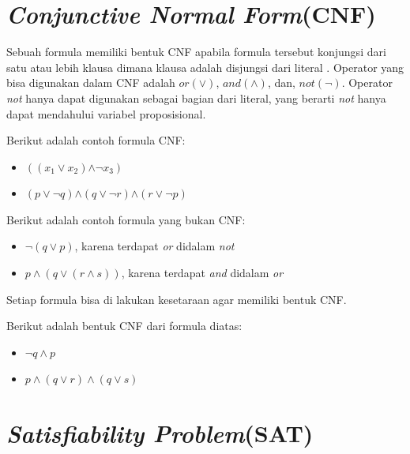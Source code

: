 	

\section{\textit{Conjunctive Normal Form}(CNF)}

Sebuah formula memiliki bentuk CNF apabila formula tersebut konjungsi dari satu atau lebih klausa dimana klausa adalah disjungsi dari literal \cite{huth2004logic}. Operator yang bisa digunakan dalam CNF adalah $\textit{or}\left(\vee\right)$, $\textit{and}\left(\wedge\right)$, dan, $\textit{not}\left(\neg\right)$. Operator \textit{not} hanya dapat digunakan sebagai bagian dari literal, yang berarti \textit{not} hanya dapat mendahului variabel proposisional.

Berikut adalah contoh formula CNF:
\begin{itemize}
	\item $\left(\left(\ensuremath{x_{1}}\ensuremath{\vee}\ensuremath{x_{2}}\right)\ensuremath{\wedge\neg}\ensuremath{x_{3}}\right)$
	\item $\left(p\vee\neg q\right)$$\wedge$$\left(q\vee\neg r\right)$$\wedge$$\left(r\vee\neg p\right)$
\end{itemize}

Berikut adalah contoh formula yang bukan CNF:
\begin{itemize}
	\item $\neg\left(q\vee p\right)$, karena terdapat \textit{or} didalam \textit{not} 
	\item $p\wedge\left(q\vee\left(r\wedge s\right)\right)$, karena terdapat \textit{and} didalam \textit{or}
	
\end{itemize}

Setiap formula bisa di lakukan kesetaraan agar memiliki bentuk CNF. 

Berikut adalah bentuk CNF dari formula diatas:
\begin{itemize}
	\item $\neg q\wedge p$
	\item $p\wedge\left(q\vee r\right)\wedge\left(q\vee s\right)$
\end{itemize}
\section{\textit{Satisfiability Problem}(SAT)}

